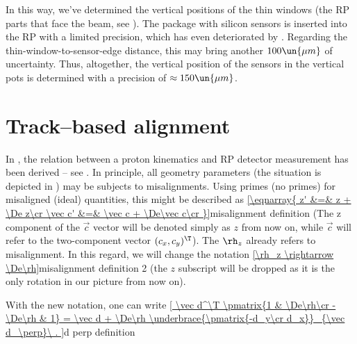 

In this way, we've determined the vertical positions of the thin windows (the RP parts that face the beam, see ). The package with silicon sensors is inserted into the RP with a limited precision, which has even deteriorated by . Regarding the thin-window-to-sensor-edge distance, this may bring another $100\un{\mu m}$ of uncertainty. Thus, altogether, the vertical position of the sensors in the vertical pots is determined with a precision of $\approx 150\un{\mu m}$.

\section[al tb]{Track--based alignment}


In , the relation between a proton kinematics and RP detector measurement has been derived -- see . In principle, all geometry parameters (the situation is depicted in ) may be subjects to misalignments. Using primes (no primes) for misaligned (ideal) quantities, this might be described as
\eqref{\eqnarray{
z' &=& z + \De z\cr
\vec c' &=& \vec c + \De\vec c\cr
}}{misalignment definition}
(The z component of the $\vec c$ vector will be denoted simply as $z$ from now on, while $\vec c$ will refer to the two-component vector $(c_x, c_y)^\T$). The $\rh_z$ already refers to misalignment. In this regard, we will change the notation
\eqref{\rh_z \rightarrow \De\rh}{misalignment definition 2}
(the $z$ subscript will be dropped as it is the only rotation in our picture from now on).

With the new notation, one can write
\eqref{
\vec d^\T \pmatrix{1 & \De\rh\cr -\De\rh & 1} =
\vec d + \De\rh \underbrace{\pmatrix{-d_y\cr d_x}}_{\vec d_\perp}\ .
}{d perp definition}

